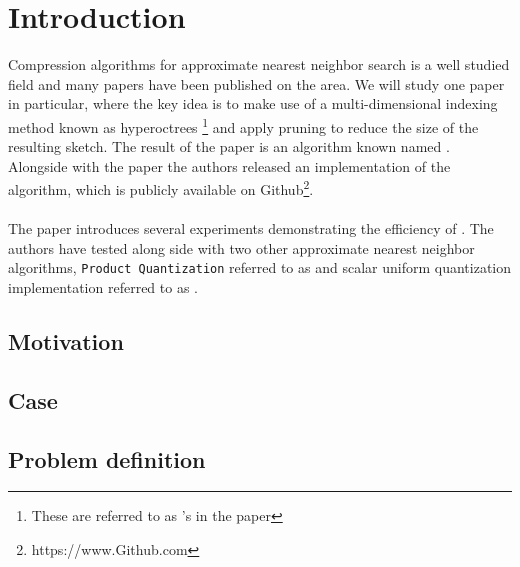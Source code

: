 \section{Introduction}
\label{introduction}
Compression algorithms for approximate nearest neighbor search is a well studied field and many papers have been published on the area. We will study one paper in particular, where the key idea is to make use of a multi-dimensional indexing method known as hyperoctrees \footnote{These are referred to as \qt{}'s in the paper} and apply pruning to reduce the size of the resulting sketch. The result of the paper is an algorithm known named \qs{}. Alongside with the paper the authors released an implementation of the algorithm, which is publicly available on Github\footnote{https://www.Github.com}.
\\
\\
The paper introduces several experiments demonstrating the efficiency of \qs{}. The authors have tested \qs{} along side with two other approximate nearest neighbor algorithms, \texttt{Product Quantization} referred to as \pq{} and scalar uniform quantization implementation referred to as \gr{}.\subsection{Motivation} %

\subsection{Case} %

\subsection{Problem definition} %
